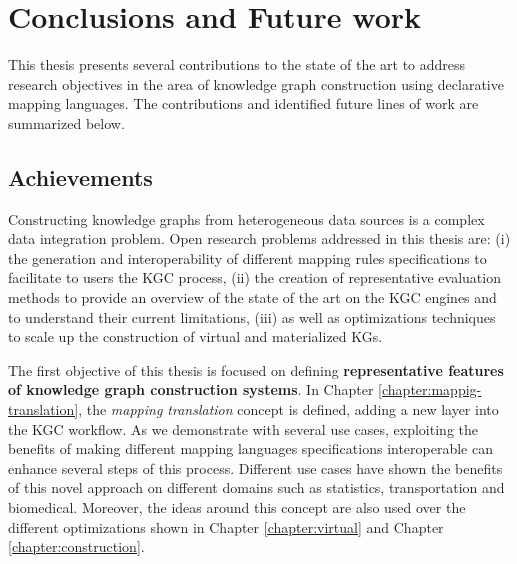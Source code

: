 \chapter{Conclusions and Future work}
\label{chap:conc}
This thesis presents several contributions to the state of the art to address research objectives in the area of knowledge graph construction using declarative mapping languages. The contributions and identified future lines of work are summarized below.


\section{Achievements}
Constructing knowledge graphs from heterogeneous data sources is a complex data integration problem. Open research problems addressed in this thesis are: (i) the generation and interoperability of different mapping rules specifications to facilitate to users the KGC process, (ii) the creation of representative evaluation methods to provide an overview of the state of the art on the KGC engines and to understand their current limitations, (iii) as well as optimizations techniques to scale up the construction of virtual and materialized KGs. 
 
 
The first objective of this thesis is focused on defining \textbf{representative features of knowledge graph construction systems}. In Chapter \ref{chapter:mappig-translation}, the \textit{mapping translation} concept is defined, adding a new layer into the KGC workflow. As we demonstrate with several use cases, exploiting the benefits of making different mapping languages specifications interoperable can enhance several steps of this process. Different use cases have shown the benefits of this novel approach on different domains such as statistics, transportation and biomedical. Moreover, the ideas around this concept are also used over the different optimizations shown in Chapter \ref{chapter:virtual} and Chapter \ref{chapter:construction}.

